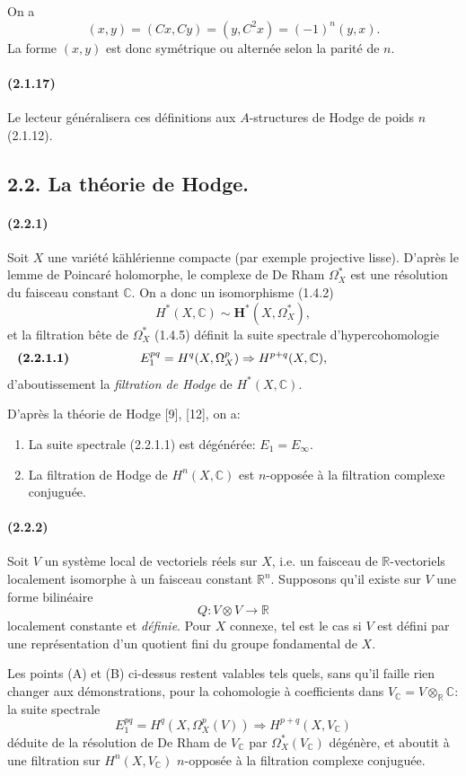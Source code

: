 \documentclass[10pt]{article}
\newcommand{\C}{\mathbb C}
\newcommand{\R}{\mathbb R}
\begin{document}
On a
\[
(x,y)=(Cx,Cy)=(y,C^2x)=(-1)^n(y,x).
\]
La forme $(x,y)$ est donc symétrique ou alternée selon la parité de $n$.

\paragraph{(2.1.17)} Le lecteur généralisera ces définitions aux $A$-structures de Hodge de poids $n$ (2.1.12).

\subsection*{2.2. La théorie de Hodge.}

\paragraph{(2.2.1)} Soit $X$ une variété kählérienne compacte (par exemple projective lisse). D'après le lemme de Poincaré holomorphe, le complexe de De Rham $\Omega_X^*$ est une résolution du faisceau constant $\C$. On a donc un isomorphisme (1.4.2)
\[
H^*(X,\C)\sim\mathbf H^*(X,\Omega_X^*),
\]
et la filtration bête de $\Omega_X^*$ (1.4.5) définit la suite spectrale d'hypercohomologie
\[
\makebox[\textwidth][s]{\textbf{(2.2.1.1)}\hfill$\displaystyle E_1^{pq}=H^q(X,\Omega_X^p)\Rightarrow H^{p+q}(X,\C),$\hfill\phantom{\textbf{(2.2.1.1)}}}
\]
d'aboutissement la \emph{filtration de Hodge} de $H^*(X,\C)$.

D'après la théorie de Hodge [9], [12], on a:
\begin{enumerate}[label=(\Alph*)]
\item La suite spectrale (2.2.1.1) est dégénérée: $E_1=E_\infty$.
\item La filtration de Hodge de $H^n(X,\C)$ est $n$-opposée à la filtration complexe conjuguée.
\end{enumerate}

\paragraph{(2.2.2)} Soit $V$ un système local de vectoriels réels sur $X$, i.e. un faisceau de $\R$-vectoriels localement isomorphe à un faisceau constant $\R^n$. Supposons qu'il existe sur $V$ une forme bilinéaire
\[
Q:V\otimes V\longrightarrow\R
\]
localement constante et \emph{définie}. Pour $X$ connexe, tel est le cas si $V$ est défini par une représentation d'un quotient fini du groupe fondamental de $X$.

Les points (A) et (B) ci-dessus restent valables tels quels, sans qu'il faille rien changer aux démonstrations, pour la cohomologie à coefficients dans $V_\C=V\otimes_\R\C$: la suite spectrale
\[
E_1^{pq}=H^q(X,\Omega_X^p(V))\Rightarrow H^{p+q}(X,V_\C)
\]
déduite de la résolution de De Rham de $V_\C$ par $\Omega_X^*(V_\C)$ dégénère, et aboutit à une filtration sur $H^n(X,V_\C)$ $n$-opposée à la filtration complexe conjuguée.
\end{document}

